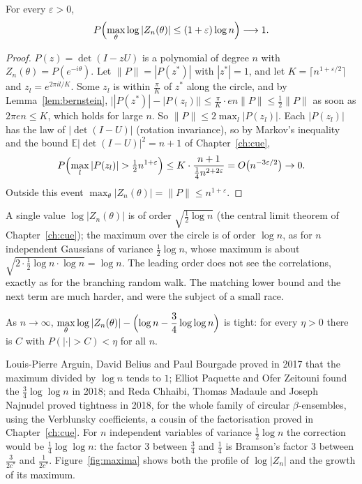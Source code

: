 \begin{theorem}\label{thm:maxupper}
For every $\varepsilon>0$,
\[
P\Bigl(\max_\theta\log|Z_n(\theta)|\le(1+\varepsilon)\log n\Bigr)\longrightarrow1 .
\]
\end{theorem}

\begin{proof}
$P(z)=\det(I-zU)$ is a polynomial of degree $n$ with $Z_n(\theta)=P(e^{-i\theta})$. Let $\|P\|=|P(z^*)|$ with $|z^*|=1$, and let $K=\lceil n^{1+\varepsilon/2}\rceil$ and $z_l=e^{2\pi il/K}$. Some $z_l$ is within $\frac\pi K$ of $z^*$ along the circle, and by
Lemma~\ref{lem:bernstein}, $\bigl||P(z^*)|-|P(z_l)|\bigr|\le\frac\pi K\cdot en\|P\|\le\frac12\|P\|$ as soon as $2\pi en\le K$, which holds for large $n$. So $\|P\|\le2\max_l|P(z_l)|$. Each $|P(z_l)|$ has the law of $|\det(I-U)|$ (rotation
invariance), so by Markov's inequality and the bound $\mathbb E|\det(I-U)|^2=n+1$ of Chapter~\ref{ch:cue},
\[
P\Bigl(\max_l|P(z_l)|>\tfrac12n^{1+\varepsilon}\Bigr)\le K\cdot\frac{n+1}{\frac14n^{2+2\varepsilon}}=O\bigl(n^{-3\varepsilon/2}\bigr)\to0 .
\]
Outside this event $\max_\theta|Z_n(\theta)|=\|P\|\le n^{1+\varepsilon}$.
\end{proof}

A single value $\log|Z_n(\theta)|$ is of order $\sqrt{\frac12\log n}$ (the central limit theorem of Chapter~\ref{ch:cue}); the maximum over the circle is of order $\log n$, as for $n$ independent Gaussians of variance $\frac12\log n$, whose maximum is about
$\sqrt{2\cdot\frac12\log n\cdot\log n}=\log n$. The leading order does not see the correlations, exactly as for the branching random walk. The matching lower bound and the next term are much harder, and were the subject of a
small race.

\begin{theorem}\label{thm:cuemax}
As $n\to\infty$, $\displaystyle\max_\theta\log|Z_n(\theta)|-\Bigl(\log n-\frac34\log\log n\Bigr)$ is tight: for every $\eta>0$ there is $C$ with $P(|\cdot|>C)<\eta$ for all $n$.
\end{theorem}

Louis-Pierre Arguin, David Belius and Paul Bourgade proved in 2017 that the maximum divided by $\log n$ tends to $1$; Elliot Paquette and Ofer Zeitouni found the $\frac34\log\log n$ in 2018; and Reda Chhaibi, Thomas Madaule and Joseph
Najnudel proved tightness in 2018, for the whole family of circular $\beta$-ensembles, using the Verblunsky coefficients, a cousin of the factorisation proved in Chapter~\ref{ch:cue}. For $n$ independent variables of variance $\frac12\log n$ the
correction would be $\frac14\log\log n$: the factor $3$ between $\frac34$ and $\frac14$ is Bramson's factor $3$ between $\frac3{2c^*}$ and $\frac1{2c^*}$. Figure~\ref{fig:maxima} shows both the profile of $\log|Z_n|$ and the growth of its maximum.

